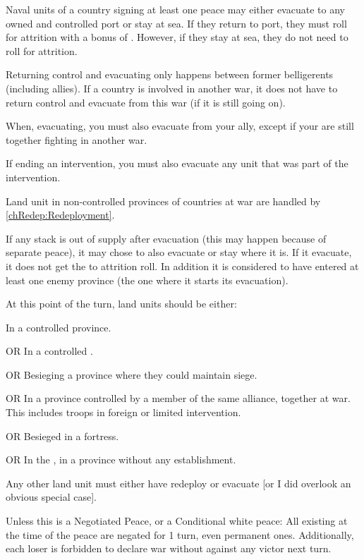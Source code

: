 Naval units of a country signing at least one peace
may either evacuate to any owned and controlled port or stay at sea.
\bparag If they return to port, they must roll for attrition with a bonus of
.
\bparag However, if they stay at sea, they do not need to roll for attrition.

\begin{designnote}
  Returning control and evacuating only happens between former belligerents
  (including allies). If a country is involved in another war, it does not
  have to return control and evacuate from this war (if it is still going
  on).

  When, evacuating, you must also evacuate from your ally, except if your are
  still together fighting in another war.
  
  If ending an intervention, you must also evacuate any unit that was part of
  the intervention.

  Land unit in non-controlled provinces of countries at war are handled by
  \ref{chRedep:Redeployment}.
\end{designnote}

 If any stack is out of supply after
evacuation (this may happen because of separate peace), it may chose to also
evacuate or stay where it is.
\bparag If it evacuate, it does not get the  to attrition roll. In
addition it is considered to have entered at least one enemy province (the one
where it starts its evacuation).

\aparag[Memento]
\bparag At this point of the turn, land units should be either:
\begin{modlist}
\item In a controlled province.
\item[OR] In a controlled \Presidio.
\item[OR] Besieging a province where they could maintain siege.
\item[OR] In a province controlled by a member of the same alliance, together
  at war. This includes troops in foreign or limited intervention.
\item[OR] Besieged in a fortress.
\item[OR] In the \ROTW, in a province without any establishment.
\end{modlist}
\bparag Any other land unit must either have redeploy or evacuate [or I did
overlook an obvious special case].

\aparag[Pacification] Unless this is a Negotiated Peace, or a Conditional
white peace:
\bparag All existing \CB at the time of the peace are negated for 1 turn, even
permanent ones.
\bparag Additionally, each loser is forbidden to declare war without \CB
against any victor next turn.

